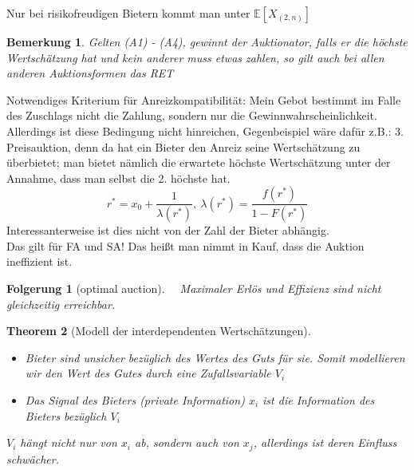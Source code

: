 \documentclass[12pt]{extreport} %
\theoremstyle{named}
\newtheorem{unnamedtheorem}{Theorem} \counterwithin{unnamedtheorem}{chapter}
\theoremstyle{itshape}
\theoremstyle{normal}
\newtheorem{folgerung}[unnamedtheorem]{Folgerung}
\newtheorem*{bemerkung}{Bemerkung}
\begin{document}
Nur bei risikofreudigen Bietern kommt man unter $\mathbb{E}\left[ X_{(2,n)} \right]$

\begin{bemerkung}
	Gelten (A1) - (A4), gewinnt der Auktionator, falls er die höchste Wertschätzung hat und kein anderer muss etwas zahlen, so gilt auch bei allen anderen Auktionsformen das RET
\end{bemerkung}

Notwendiges Kriterium für Anreizkompatibilität: Mein Gebot bestimmt im Falle des Zuschlags nicht die Zahlung, sondern nur die Gewinnwahrscheinlichkeit. Allerdings ist diese Bedingung nicht hinreichen, Gegenbeispiel wäre dafür z.B.: 3. Preisauktion, denn da hat ein Bieter den Anreiz seine Wertschätzung zu überbietet; man bietet nämlich die erwartete höchste Wertschätzung unter der Annahme, dass man selbst die 2. höchste hat. ~\\

$$r^{*} = x_{0} + \frac{1}{\lambda(r^{*})}, ~ \lambda(r^{*}) = \frac{f(r^{*})}{1 - F(r^{*})}$$
Interessanterweise ist dies nicht von der Zahl der Bieter abhängig. ~\\

Das gilt für FA und SA! Das heißt man nimmt in Kauf, dass die Auktion ineffizient ist. ~\\

\begin{folgerung}[optimal auction] ~\
	Maximaler Erlös und Effizienz sind nicht gleichzeitig erreichbar. %
\end{folgerung}

\begin{unnamedtheorem}[Modell der interdependenten Wertschätzungen] ~\
	\begin{itemize}
		\item Bieter sind unsicher bezüglich des Wertes des Guts für sie. Somit modellieren wir den Wert des Gutes durch eine Zufallsvariable $V_{i}$
		\item Das Signal des Bieters (private Information) $x_{i}$ ist die Information des Bieters bezüglich $V_{i}$
	\end{itemize}
\textit{$V_{i}$ hängt nicht nur von $x_{i}$ ab, sondern auch von $x_{j}$, allerdings ist deren Einfluss schwächer.}
\end{unnamedtheorem}
\end{document}
